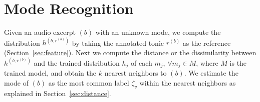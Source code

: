 \documentclass{sig-alternate}
\begin{document}
%
%
%
%
%
%
%
%

\section{Mode Recognition}\label{sec:mode}
Given an audio excerpt $(b)$ with an unknown mode, we compute the distribution $h^{\left(b, r^{(b)}\right)}$ by taking the annotated tonic $r^{(b)}$ as the reference (Section~\ref{sec:feature}). Next we compute the distance or the dissimilarity between $h^{\left(b, r^{(b)}\right)}$ and the trained distribution $h_j$ of each $m_j$, $\forall m_j \in M$, where $M$ is the trained model, and obtain the $k$ nearest neighbors to $(b)$. We estimate the mode of $(b)$ as the most common label $\zeta_v$ within the nearest neighbors as explained in Section~\ref{sec:distance}.
\end{document}
